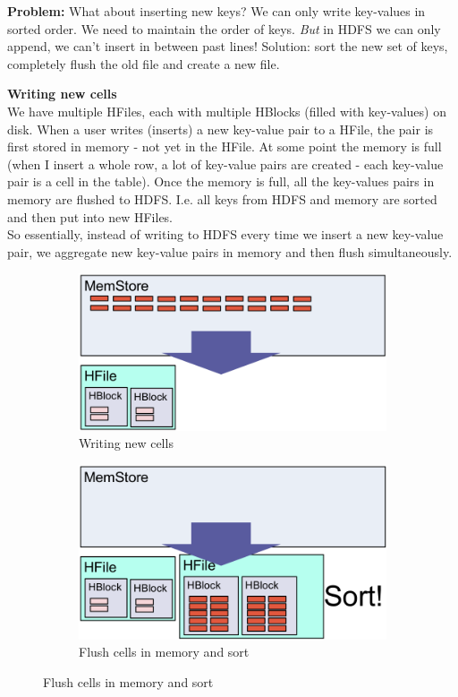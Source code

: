 \documentclass[11pt,oneside,a4paper]{article}
\begin{document}
\textbf{Problem:} What about inserting new keys? We can only write key-values in sorted order. We need to maintain the order of keys. \textit{But} in HDFS we can only append, we can't insert in between past lines! Solution: sort the new set of keys, completely flush the old file and create a new file.

\textbf{Writing new cells}\\
We have multiple HFiles, each with multiple HBlocks (filled with key-values) on disk. When a user writes (inserts) a new key-value pair to a HFile, the pair is first stored in memory - not yet in the HFile. At some point the memory is full (when I insert a whole row, a lot of key-value pairs are created - each key-value pair is a cell in the table). Once the memory is full, all the key-values pairs in memory are flushed to HDFS. I.e. all keys from HDFS and memory are sorted and then put into new HFiles.\\
So essentially, instead of writing to HDFS every time we insert a new key-value pair, we aggregate new key-value pairs in memory and then flush simultaneously.

\begin{figure}[hb!]
	\centering
	\begin{subfigure}[t]{.5\textwidth}
		\centering
		\includegraphics[width=0.7\linewidth]{figures/hbase_write_cells}
		\caption{Writing new cells}
		\label{fig:hbasewritecells}
	\end{subfigure}%
	\begin{subfigure}[t]{.5\textwidth}
		\centering
		\includegraphics[width=0.7\linewidth]{figures/hbase_flush_cells}
		\caption{Flush cells in memory and sort}
		\label{fig:hbaseflushcells}
	\end{subfigure}
\end{figure}
\end{document}
